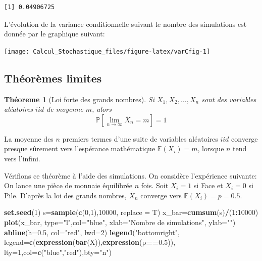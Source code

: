 \documentclass[
]{book}
\newenvironment{Shaded}{\begin{snugshade}}{\end{snugshade}}
\newcommand{\DataTypeTok}[1]{\textcolor[rgb]{0.13,0.29,0.53}{#1}}
\newcommand{\DecValTok}[1]{\textcolor[rgb]{0.00,0.00,0.81}{#1}}
\newcommand{\FloatTok}[1]{\textcolor[rgb]{0.00,0.00,0.81}{#1}}
\newcommand{\KeywordTok}[1]{\textcolor[rgb]{0.13,0.29,0.53}{\textbf{#1}}}
\newcommand{\NormalTok}[1]{#1}
\newcommand{\OperatorTok}[1]{\textcolor[rgb]{0.81,0.36,0.00}{\textbf{#1}}}
\newcommand{\StringTok}[1]{\textcolor[rgb]{0.31,0.60,0.02}{#1}}
\newtheorem{theorem}{Théoreme}[chapter]
\theoremstyle{definition}
\theoremstyle{definition}
\theoremstyle{definition}
\theoremstyle{remark}
\begin{document}
\begin{verbatim}
[1] 0.04906725
\end{verbatim}

L'évolution de la variance conditionnelle suivant le nombre des simulations est donnée par le graphique suivant:

\begin{center}\texttt{[image: Calcul\_Stochastique\_files/figure-latex/varCfig-1]} \end{center}

\hypertarget{thuxe9oruxe8mes-limites}{%
\subsection{Théorèmes limites}\label{thuxe9oruxe8mes-limites}}

\begin{theorem}[Loi forte des grands nombres]
\protect\hypertarget{thm:unnamed-chunk-32}{}{\label{thm:unnamed-chunk-32} {} }Si \(X_1,X_2,\ldots, X_n\) sont des variables aléatoires \(iid\) de moyenne \(m\), alors
\[
\mathbb{P}\left[\lim_{n \rightarrow \infty}\overline{X}_n=m \right]=1
\]
\end{theorem}
La moyenne des \(n\) premiers termes d'une suite de variables aléatoires \(iid\) converge presque sûrement vers l'espérance mathématique \(\mathbb{E}(X_i)=m\), lorsque \(n\) tend vers l'infini.

Vérifions ce théorème à l'aide des simulations. On considère l'expérience suivante: On lance une pièce de monnaie équilibrée \(n\) fois. Soit \(X_i=1\) si Face et \(X_i=0\) si Pile. D'après la loi des grands nombres, \(\overline{X}_n\) converge vers \(\mathbb{E}(X_i)=p=0.5\).

\begin{Shaded}
\begin{Highlighting}[]
\KeywordTok{set.seed}\NormalTok{(}\DecValTok{1}\NormalTok{)}
\NormalTok{s=}\KeywordTok{sample}\NormalTok{(}\KeywordTok{c}\NormalTok{(}\DecValTok{0}\NormalTok{,}\DecValTok{1}\NormalTok{),}\DecValTok{10000}\NormalTok{, }\DataTypeTok{replace =}\NormalTok{ T)}
\NormalTok{x_bar=}\KeywordTok{cumsum}\NormalTok{(s)}\OperatorTok{/}\NormalTok{(}\DecValTok{1}\OperatorTok{:}\DecValTok{10000}\NormalTok{)}
\KeywordTok{plot}\NormalTok{(x_bar, }\DataTypeTok{type=}\StringTok{"l"}\NormalTok{,}\DataTypeTok{col=}\StringTok{"blue"}\NormalTok{, }\DataTypeTok{xlab=}\StringTok{"Nombre de simulations"}\NormalTok{, }
     \DataTypeTok{ylab=}\StringTok{""}\NormalTok{)}
\KeywordTok{abline}\NormalTok{(}\DataTypeTok{h=}\FloatTok{0.5}\NormalTok{, }\DataTypeTok{col=}\StringTok{"red"}\NormalTok{, }\DataTypeTok{lwd=}\DecValTok{2}\NormalTok{)}
\KeywordTok{legend}\NormalTok{(}\StringTok{"bottomright"}\NormalTok{, }\DataTypeTok{legend=}\KeywordTok{c}\NormalTok{(}\KeywordTok{expression}\NormalTok{(}\KeywordTok{bar}\NormalTok{(X)),}\KeywordTok{expression}\NormalTok{(p}\OperatorTok{==}\FloatTok{0.5}\NormalTok{)),}
       \DataTypeTok{lty=}\DecValTok{1}\NormalTok{,}\DataTypeTok{col=}\KeywordTok{c}\NormalTok{(}\StringTok{"blue"}\NormalTok{,}\StringTok{"red"}\NormalTok{),}\DataTypeTok{bty=}\StringTok{"n"}\NormalTok{)}
\end{Highlighting}
\end{Shaded}
\end{document}
